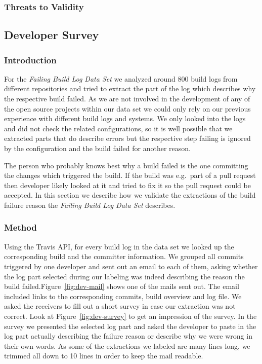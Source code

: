 \documentclass[\myrootdir/main.tex]{subfiles}
\begin{document}
\subsubsection{Threats to Validity}

\subsection{Developer Survey}
\subsubsection{Introduction}
For the \emph{Failing Build Log Data Set} we analyzed around 800 build logs from different repositories and tried to extract the part of the log which describes why the respective build failed.
As we are not involved in the development of any of the open source projects within our data set we could only rely on our previous experience with different build logs and systems.
We only looked into the logs and did not check the related configurations, so it is well possible that we extracted parts that do describe errors but the respective step failing is ignored by the configuration and the build failed for another reason.

The person who probably knows best why a build failed is the one committing the changes which triggered the build.
If the build was e.g.\ part of a pull request then developer likely looked at it and tried to fix it so the pull request could be accepted.
In this section we describe how we validate the extractions of the build failure reason the \emph{Failing Build Log Data Set} describes.
\subsubsection{Method}
Using the Travis API, for every build log in the data set we looked up the corresponding build and the committer information.
We grouped all commits triggered by one developer and sent out an email to each of them, asking whether the log part selected during our labeling was indeed describing the reason the build failed.Figure~\ref{fig:dev-mail} shows one of the mails sent out.
The email included links to the corresponding commits, build overview and log file.
We asked the receivers to fill out a short survey in case our extraction was not correct.
Look at Figure~\ref{fig:dev-survey} to get an impression of the survey.
In the survey we presented the selected log part and asked the developer to paste in the log part actually describing the failure reason or describe why we were wrong in their own words.
As some of the extractions we labeled are many lines long, we trimmed all down to 10 lines in order to keep the mail readable.
\end{document}
